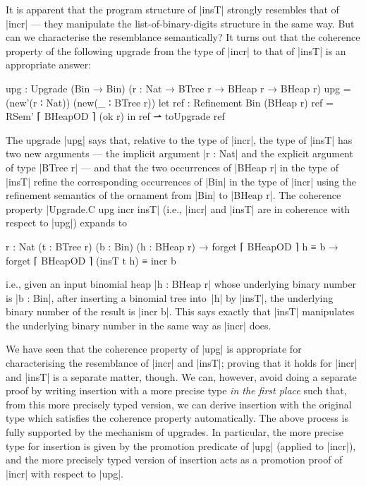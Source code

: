 It is apparent that the program structure of |insT| strongly resembles that of |incr| --- they manipulate the list-of-binary-digits structure in the same way.
But can we characterise the resemblance semantically?
It turns out that the coherence property of the following upgrade from the type of |incr| to that of |insT| is an appropriate answer:
\begin{code}
upg : Upgrade (Bin → Bin) ({r : Nat} → BTree r → BHeap r → BHeap r)
upg =  (new'(r ∶ Nat)) (new(_ ∶ BTree r))
         let  ref : Refinement Bin (BHeap r)
              ref = RSem' ⌈ BHeapOD ⌉ (ok r)
         in   ref ⇀ toUpgrade ref
\end{code}
The upgrade |upg| says that, relative to the type of |incr|, the type of |insT| has two new arguments --- the implicit argument |r : Nat| and the explicit argument of type |BTree r| --- and that the two occurrences of |BHeap r| in the type of |insT| refine the corresponding occurrences of |Bin| in the type of |incr| using the refinement semantics of the ornament from |Bin| to |BHeap r|.
The coherence property |Upgrade.C upg incr insT| (i.e., |incr| and |insT| are in coherence with respect to |upg|) expands to
\begin{code}
{r : Nat} (t : BTree r) (b : Bin) (h : BHeap r) →
forget ⌈ BHeapOD ⌉ h ≡ b → forget ⌈ BHeapOD ⌉ (insT t h) ≡ incr b
\end{code}
i.e., given an input binomial heap |h : BHeap r| whose underlying binary number is |b : Bin|, after inserting a binomial tree into~|h| by |insT|, the underlying binary number of the result is |incr b|.
This says exactly that |insT| manipulates the underlying binary number in the same way as |incr| does.

We have seen that the coherence property of |upg| is appropriate for characterising the resemblance of |incr| and |insT|; proving that it holds for |incr| and |insT| is a separate matter, though.
We can, however, avoid doing a separate proof by writing insertion with a more precise type \emph{in the first place} such that, from this more precisely typed version, we can derive insertion with the original type which satisfies the coherence property automatically.
The above process is fully supported by the mechanism of upgrades.
In particular, the more precise type for insertion is given by the promotion predicate of |upg| (applied to |incr|), and the more precisely typed version of insertion acts as a promotion proof of |incr| with respect to |upg|.

